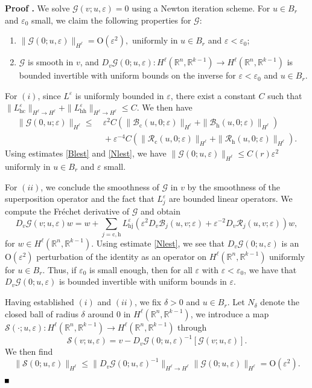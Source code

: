 \documentclass[10pt]{article}
\newenvironment{Proof}[1][\unskip]%
 {\begin{trivlist} \item[]{\bf Proof #1. }}%
 {\hspace*{\fill}$\rule{.4\baselineskip}{.4\baselineskip}$\end{trivlist}}
\newcommand{\R}{\mathbb{R}}
\newcommand{\rmO}{\mathrm{O}}
\newcommand{\eps}{\varepsilon}
\newcommand{\G}{\mathcal{G}}
\newcommand{\cS}{\mathcal{S}}
\newcommand{\Rm}{\mathcal{R}}
\begin{document}
\begin{Proof}We solve $\G(v;u,\eps)=0$ using a Newton iteration scheme. For $u \in B_r$ and $\eps_0$ small, we claim the following properties for $\G$:
\begin{enumerate}
\item $\|\G(0;u,\eps)\|_{H^\ell} = \rmO(\eps^2),$ uniformly in $u\in B_r$ and $\eps < \eps_0$;
\item $\G$ is smooth in $v$, and $D_v \G(0; u, \eps):H^\ell(\R^n,\R^{k-1}) \to H^\ell(\R^n,\R^{k-1})$ is bounded invertible with uniform bounds on the inverse for ${\eps}<\eps_0$ and $u \in B_r$. 
\end{enumerate}

For $(i)$, since $L^\eps$ is uniformly bounded in $\eps$, there exist a constant $C$ such that $\| L_\mathrm{hc}^\eps\|_{H^\ell \to H^\ell}+\| L_\mathrm{hh}^\eps \|_{H^\ell \to H^\ell } \le C$. We then have
\begin{align*}
\|\G(0,u;\eps)\|_{H^\ell} \le&\  \eps^2C(\|\mathcal{B}_\mathrm{c}(u,0;\eps)\|_{H^\ell} +\|\mathcal{B}_\mathrm{h}(u,0;\eps)\|_{H^\ell})\\
&\ +\eps^{-4}C(\|\Rm_\mathrm{c}(u,0;\eps)\|_{H^\ell}+\|\Rm_\mathrm{h}(u,0;\eps)\|_{H^\ell}).
\end{align*}
Using estimates \eqref{Blest} and \eqref{Nlest}, we have $\|\G(0;u,\eps)\|_{H^\ell} \le C(r) \eps^2$ uniformly in $u\in B_r$ and $\eps$ small.

For $(ii)$, we conclude the smoothness of $\mathcal{G}$ in $v$ by the smoothness of the superposition operator and the fact that $L^\eps_j$ are bounded linear operators. We compute the Fr\'echet derivative of $\G$ and obtain
\[ 
D_v\G(v;u,\eps) w = w+ \sum_{j=\mathrm{c,h}} L_\mathrm{hj}^\eps \left(\eps^2 D_v \mathcal{B}_j (u,v;\eps)+ \eps^{-2} D_v\Rm_j(u,v;\eps) \right) w,
\] 
for $w \in H^\ell(\R^n,\R^{k-1})$. Using estimate \eqref{Nlest}, we see that $D_v\G(0; u, \eps)$ is an $\rmO(\eps^2)$ perturbation of the identity as an operator on $H^\ell(\R^n,\R^{k-1})$ uniformly for $u \in B_r$. Thus, if $\eps_0$ is small enough, then for all $\eps$ with ${\eps}<\eps_0$, we have that $D_v\G(0;u,\eps)$ is bounded invertible with uniform bounds in $\eps$.


Having established $(i)$ and $(ii)$, we fix $\delta>0$ and $u \in B_r$. Let $N_\delta$ denote the closed ball of radius $\delta$ around $0$ in $H^\ell(\R^n,\R^{k-1})$, we introduce a map $\cS(\cdot; u,\eps): H^\ell(\R^n,\R^{k-1}) \to H^\ell(\R^n,\R^{k-1})$ through
\[
\cS(v; u,\eps) = v - D_v\G(0;u, \eps)^{-1}[\G(v;u,\eps)].
\]
We then find
\[
\|\cS(0;u,\eps) \|_{H^\ell} \le \|D_v\G(0;u,\eps)^{-1}\|_{H^\ell\to H^\ell} \|\G(0;u, \eps)\|_{H^\ell} = \rmO(\eps^2).
\]


\end{Proof}
\end{document}

